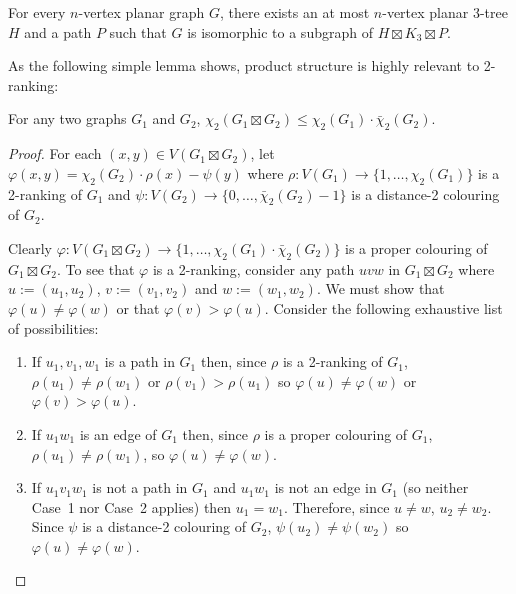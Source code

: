 \documentclass[kpfonts]{patmorin}
\newcommand{\trn}{\chi_2}
\newcommand{\dtcn}{\bar{\chi}_2}
\theoremstyle{named}
\begin{document}
\begin{thm}\label{product-structure}
    For every $n$-vertex planar graph $G$, there exists an at most $n$-vertex planar 3-tree $H$ and a path $P$ such that $G$ is isomorphic to a subgraph of $H\boxtimes K_3\boxtimes P$.
\end{thm}

As the following simple lemma shows, product structure is highly relevant to 2-ranking:

\begin{lem}\label{product-lemma}
    For any two graphs $G_1$ and $G_2$, $\trn(G_1\boxtimes G_2)\le \trn(G_1)\cdot\dtcn(G_2)$.
\end{lem}

\begin{proof}
    For each $(x,y)\in V(G_1\boxtimes G_2)$, let $\varphi(x,y)=\trn(G_2)\cdot \rho(x) - \psi(y)$ where $\rho:V(G_1)\to\{1,\ldots,\trn(G_1)\}$ is a 2-ranking of $G_1$ and $\psi:V(G_2)\to\{0,\ldots,\dtcn(G_2)-1\}$ is a distance-2 colouring of $G_2$.

    Clearly $\varphi:V(G_1\boxtimes G_2)\to \{1,\ldots,\trn(G_1)\cdot\dtcn(G_2)\}$ is a proper colouring of $G_1\boxtimes G_2$.  To see that $\varphi$ is a 2-ranking, consider any path $uvw$ in $G_1\boxtimes G_2$ where $u:=(u_1,u_2)$, $v:=(v_1,v_2)$ and $w:=(w_1,w_2)$.  We must show that $\varphi(u)\neq\varphi(w)$ or that $\varphi(v)>\varphi(u)$.  Consider the following exhaustive list of possibilities:
    \begin{enumerate}
        \item If $u_1,v_1,w_1$ is a path in $G_1$ then, since $\rho$ is a 2-ranking of $G_1$, $\rho(u_1)\neq\rho(w_1)$ or $\rho(v_1)>\rho(u_1)$ so $\varphi(u)\neq \varphi(w)$ or $\varphi(v)>\varphi(u)$.

        \item If $u_1w_1$ is an edge of $G_1$ then, since $\rho$ is a proper colouring of $G_1$, $\rho(u_1)\neq\rho(w_1)$, so $\varphi(u)\neq\varphi(w)$.

        \item If $u_1v_1w_1$ is not a path in $G_1$ and $u_1w_1$ is not an edge in $G_1$ (so neither Case~1 nor Case~2 applies) then $u_1=w_1$.  Therefore, since $u\neq w$, $u_2\neq w_2$. Since $\psi$ is a distance-2 colouring of $G_2$, $\psi(u_2)\neq\psi(w_2)$ so $\varphi(u)\neq\varphi(w)$.
         \qedhere
    \end{enumerate}
\end{proof}
\end{document}

